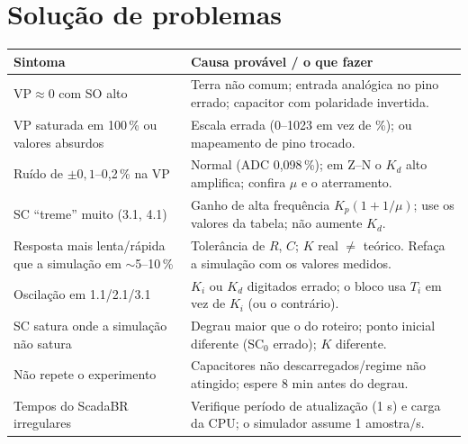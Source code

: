 \documentclass[11pt,a4paper]{article}
\begin{document}
\section{Solução de problemas}
\begin{center}\small
\begin{tabular}{p{4.6cm}p{10.4cm}}\toprule Sintoma & Causa provável / o que fazer\\\midrule
VP$\approx0$ com SO alto & Terra não comum; entrada analógica no pino errado; capacitor com polaridade invertida.\\
VP saturada em 100\,\% ou valores absurdos & Escala errada (0--1023 em vez de \%); ou mapeamento de pino trocado.\\
Ruído de $\pm0{,}1$--0,2\,\% na VP & Normal (ADC 0,098\,\%); em Z--N o $K_d$ alto amplifica; confira $\mu$ e o aterramento.\\
SC ``treme'' muito (3.1, 4.1) & Ganho de alta frequência $K_p(1+1/\mu)$; use os valores da tabela; não aumente $K_d$.\\
Resposta mais lenta/rápida que a simulação em $\sim$5--10\,\% & Tolerância de $R$, $C$; $K$ real $\ne$ teórico. Refaça a simulação com os valores medidos.\\
Oscilação em 1.1/2.1/3.1 & $K_i$ ou $K_d$ digitados errado; o bloco usa $T_i$ em vez de $K_i$ (ou o contrário).\\
SC satura onde a simulação não satura & Degrau maior que o do roteiro; ponto inicial diferente (SC$_0$ errado); $K$ diferente.\\
Não repete o experimento & Capacitores não descarregados/regime não atingido; espere 8 min antes do degrau.\\
Tempos do ScadaBR irregulares & Verifique período de atualização (1 s) e carga da CPU; o simulador assume 1 amostra/s.\\\bottomrule\end{tabular}\end{center}
\end{document}
